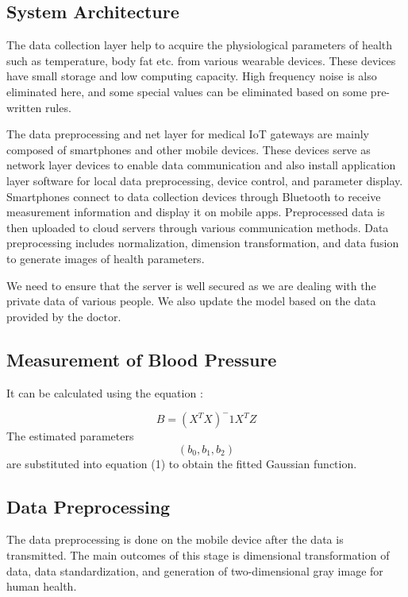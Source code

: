 \documentclass{article}
\begin{document}
\subsection{System Architecture}
The data collection layer help to acquire the physiological parameters of health such as temperature, body fat etc. from various wearable devices. These devices have small storage and low computing capacity. High frequency noise is also eliminated here, and some special values can be eliminated based on some pre-written rules. 

The data preprocessing and net layer for medical IoT gateways are mainly composed of smartphones and other mobile devices. These devices serve as network layer devices to enable data communication and also install application layer software for local data preprocessing, device control, and parameter display. Smartphones connect to data collection devices through Bluetooth to receive measurement information and display it on mobile apps. Preprocessed data is then uploaded to cloud servers through various communication methods. Data preprocessing includes normalization, dimension transformation, and data fusion to generate images of health parameters.

We need to ensure that the server is well secured as we are dealing with the private data of various people. We also update the model based on the data provided by the doctor. 

\subsection{Measurement of Blood Pressure}
It can be calculated using the equation :

\begin{equation}
    B = (X^T X)^-1 X^T Z
\end{equation}
The estimated parameters \begin{equation} (b_0, b_1, b_2) \end{equation} are substituted into equation (1) to obtain the fitted Gaussian function. 

\subsection{Data Preprocessing}
The data preprocessing is done on the mobile device after the data is transmitted. The main outcomes of this stage is dimensional transformation of data, data standardization, and generation of two-dimensional gray image for human health. 
\end{document}
